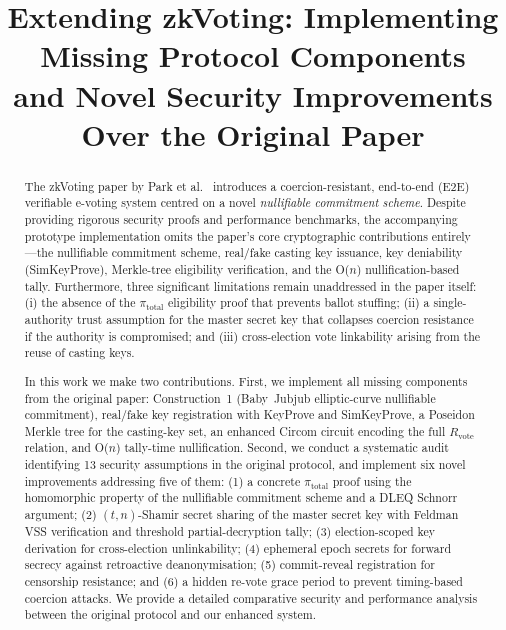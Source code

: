 \documentclass[conference]{IEEEtran}
\begin{document}
\title{Extending zkVoting: Implementing Missing Protocol Components\\
and Novel Security Improvements Over the Original Paper}

\author{
\and
{}
}

\maketitle

\begin{abstract}
The zkVoting paper by Park et al.\ \cite{park2024zkvoting} introduces a coercion-resistant,
end-to-end (E2E) verifiable e-voting system centred on a novel \emph{nullifiable
commitment scheme}.  Despite providing rigorous security proofs and performance
benchmarks, the accompanying prototype implementation omits the paper's core
cryptographic contributions entirely---the nullifiable commitment scheme,
real/fake casting key issuance, key deniability (SimKeyProve), Merkle-tree
eligibility verification, and the O($n$) nullification-based tally.  Furthermore,
three significant limitations remain unaddressed in the paper itself: (i) the
absence of the $\pi_{\text{total}}$ eligibility proof that prevents ballot
stuffing; (ii) a single-authority trust assumption for the master secret key
that collapses coercion resistance if the authority is compromised; and (iii)
cross-election vote linkability arising from the reuse of casting keys.

In this work we make two contributions.  First, we implement all missing
components from the original paper: Construction~1 (Baby~Jubjub
elliptic-curve nullifiable commitment), real/fake key registration with
KeyProve and SimKeyProve, a Poseidon Merkle tree for the casting-key set, an
enhanced Circom circuit encoding the full $R_{\text{vote}}$ relation, and
O($n$) tally-time nullification.  Second, we conduct a systematic audit
identifying 13 security assumptions in the original protocol, and
implement six novel improvements addressing five of them:
(1) a concrete $\pi_{\text{total}}$ proof using the
homomorphic property of the nullifiable commitment scheme and a DLEQ Schnorr
argument; (2) $(t,n)$-Shamir secret sharing of the master secret key with
Feldman VSS verification and threshold partial-decryption tally; (3)
election-scoped key derivation for cross-election unlinkability; (4)
ephemeral epoch secrets for forward secrecy against retroactive
deanonymisation; (5) commit-reveal registration for censorship resistance;
and (6) a hidden re-vote grace period to prevent timing-based coercion
attacks.  We provide a detailed comparative security and performance analysis
between the original protocol and our enhanced system.
\end{abstract}
\end{document}

